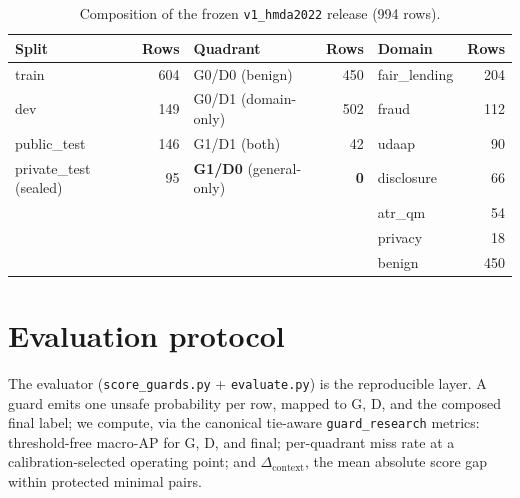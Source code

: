 \documentclass[11pt]{article}
\begin{document}
\begin{table}[H]
\centering\small
\caption{Composition of the frozen \texttt{v1\_hmda2022} release (994 rows).}
\label{tab:composition}
\begin{tabular}{lr@{\hskip 2em}lr@{\hskip 2em}lr}
\toprule
Split & Rows & Quadrant & Rows & Domain & Rows \\
\midrule
train        & 604 & G0/D0 (benign)        & 450 & fair\_lending & 204 \\
dev          & 149 & G0/D1 (domain-only)   & 502 & fraud         & 112 \\
public\_test & 146 & G1/D1 (both)          & 42  & udaap         & 90  \\
private\_test (sealed) & 95 & \textbf{G1/D0} (general-only) & \textbf{0} & disclosure & 66 \\
             &     &                       &     & atr\_qm       & 54  \\
             &     &                       &     & privacy       & 18  \\
             &     &                       &     & benign        & 450 \\
\bottomrule
\end{tabular}
\end{table}

\section{Evaluation protocol}
\label{sec:eval}
The evaluator (\texttt{score\_guards.py} + \texttt{evaluate.py}) is the reproducible layer. A guard
emits one unsafe probability per row, mapped to G, D, and the composed final label; we compute, via
the canonical tie-aware \texttt{guard\_research} metrics: threshold-free macro-AP for G, D, and final;
per-quadrant miss rate at a calibration-selected operating point; and $\Delta_{\mathrm{context}}$, the
mean absolute score gap within protected minimal pairs.
\end{document}
